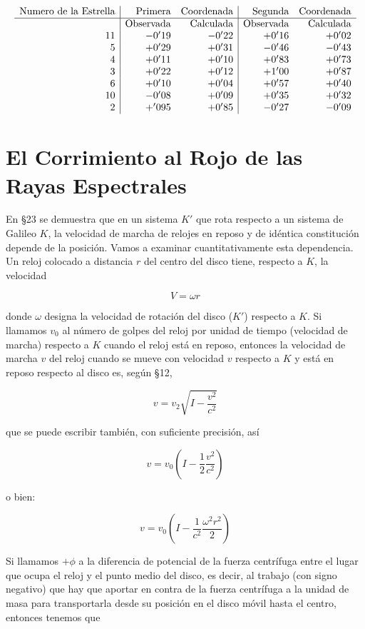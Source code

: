 \documentclass[spanish]{book}
\begin{document}
\[
\begin{array}{r|rr|rr}
\mbox{Numero de la Estrella} & \mbox{Primera} & \mbox{Coordenada} & \mbox{Segunda} & \mbox{Coordenada}\\
\hline  & \mbox{Observada} & \mbox{Calculada} & \mbox{Observada} & \mbox{Calculada}\\
11 & -0'19 & -0'22 & +0'16 & +0'02\\
5 & +0'29 & +0'31 & -0'46 & -0'43\\
4 & +0'11 & +0'10 & +0'83 & +0'73\\
3 & +0'22 & +0'12 & +1'00 & +0'87\\
6 & +0'10 & +0'04 & +0'57 & +0'40\\
10 & -0'08 & +0'09 & +0'35 & +0'32\\
2 & +'095 & +0'85 & -0'27 & -0'09
\end{array}
\]


\section{El Corrimiento al Rojo de las Rayas Espectrales}

En \S 23 se demuestra que en un sistema $K'$ que rota respecto a un sistema de
Galileo $K$, la velocidad de marcha de relojes en reposo y de idéntica constitución
depende de la posición. Vamos a examinar cuantitativamente esta dependencia. Un
reloj colocado a distancia $r$ del centro del disco tiene, respecto a $K$, la velocidad

\[V=\omega r\]

\noindent donde $\omega$ designa la velocidad de rotación del disco ($K'$) respecto a $K$. Si llamamos $v_{0}$ al
número de golpes del reloj por unidad de tiempo (velocidad de marcha) respecto a $K$
cuando el reloj está en reposo, entonces la velocidad de marcha $v$ del reloj cuando se
mueve con velocidad $v$ respecto a $K$ y está en reposo respecto al disco es, según \S 12,

\[v=v_{2}\sqrt{I-\frac{v^{2}}{c^{2}}}\]

\noindent que se puede escribir también, con suficiente precisión, así

\[v=v_{0}\left(I-\frac{1}{2}\frac{v^{2}}{c^{2}}\right)\]

\noindent o bien:

\[v=v_{0}\left(I-\frac{1}{c^{2}}\frac{\omega^{2}r^{2}}{2}\right)\]

Si llamamos $+\phi$ a la diferencia de potencial de la fuerza centrífuga entre el
lugar que ocupa el reloj y el punto medio del disco, es decir, al trabajo (con signo
negativo) que hay que aportar en contra de la fuerza centrífuga a la unidad de masa para
transportarla desde su posición en el disco móvil hasta el centro, entonces tenemos que
\end{document}
